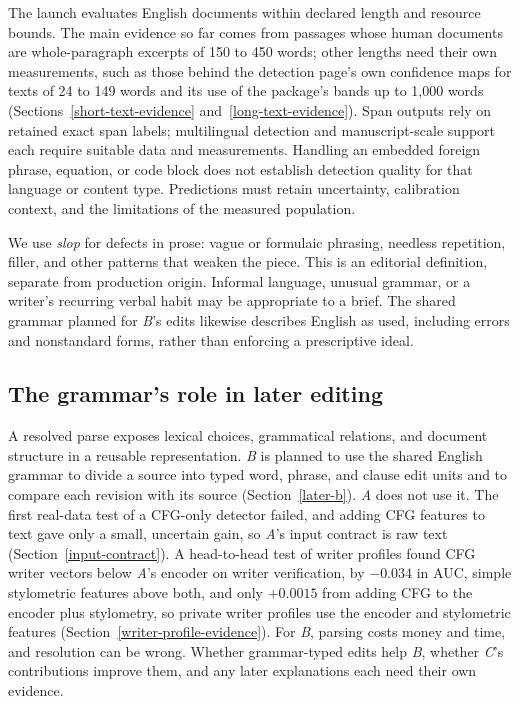 The launch evaluates English documents within declared length and resource
bounds. The main evidence so far comes from passages whose human documents
are whole-paragraph excerpts of 150 to 450 words; other lengths need their own
measurements, such as those behind the detection page's own confidence maps
for texts of 24 to 149 words and its use of the package's bands up to 1,000
words
(Sections~\ref{short-text-evidence} and~\ref{long-text-evidence}). Span outputs rely on retained exact span labels; multilingual
detection and manuscript-scale support each require suitable data and
measurements. Handling an embedded
foreign phrase, equation, or code block does not establish detection quality
for that language or content type. Predictions must retain uncertainty,
calibration context, and the limitations of the measured population.

We use \emph{slop} for defects in prose: vague or formulaic phrasing, needless
repetition, filler, and other patterns that weaken the piece. This is an
editorial definition, separate from production origin. Informal language,
unusual grammar, or a writer's recurring verbal habit may be appropriate to a
brief. The shared grammar planned for \textit{B}'s edits likewise describes
English as used, including errors and nonstandard forms, rather than enforcing
a prescriptive ideal.

\subsection{The grammar's role in later editing}\label{grammar-role}

A resolved parse exposes lexical choices, grammatical relations, and document
structure in a reusable representation. \textit{B} is planned to use the shared
English grammar to divide a source into typed word, phrase, and clause edit
units and to compare each revision with its source (Section~\ref{later-b}).
\textit{A} does not use it. The first real-data test of a CFG-only detector
failed, and adding CFG features to text gave only a small, uncertain gain, so
\textit{A}'s input contract is raw text (Section~\ref{input-contract}). A
head-to-head test of writer profiles found CFG writer vectors below
\textit{A}'s encoder on writer verification, by \(-0.034\) in AUC, simple
stylometric features above both, and only \(+0.0015\) from adding CFG to the
encoder plus stylometry, so private writer profiles use the encoder and
stylometric features (Section~\ref{writer-profile-evidence}). For \textit{B},
parsing costs money and time, and resolution can be wrong. Whether grammar-typed edits help
\textit{B}, whether \textit{C}'s contributions improve them, and any later
explanations each need their own evidence.

